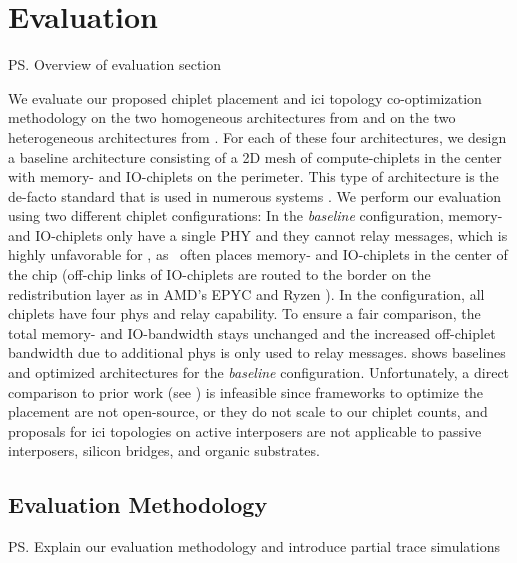\section{Evaluation}
\label{sec:eval}
\vspace{-0.5em}

\ps{Overview of evaluation section}


We evaluate our proposed chiplet placement and \gls{ici} topology co-optimization methodology on the two homogeneous architectures from  and on the two heterogeneous architectures from .
For each of these four architectures, we design a baseline architecture consisting of a 2D mesh of compute-chiplets in the center with memory- and IO-chiplets on the perimeter.
This type of architecture is the de-facto standard that is used in numerous systems \cite{dataflow_accel_dnn, cifher, simba, hecaton, dojo}.
We perform our evaluation using two different chiplet configurations: 
In the \textit{baseline} configuration, memory- and IO-chiplets only have a single PHY and they cannot relay messages, which is highly unfavorable for \name, as \name~often places memory- and IO-chiplets in the center of the chip (off-chip links of IO-chiplets are routed to the border on the redistribution layer as in AMD's EPYC and Ryzen \cite{amd-chiplet}).
In the \textit{\name} configuration, all chiplets have four \gls{phys} and relay capability.
To ensure a fair comparison, the total memory- and IO-bandwidth stays unchanged and the increased off-chiplet bandwidth due to additional \gls{phys} is only used to relay messages.
 shows baselines and optimized architectures for the \textit{baseline} configuration.
Unfortunately, a direct comparison to prior work (see ) is infeasible since frameworks to optimize the placement are not open-source, or they do not scale to our chiplet counts, and proposals for \gls{ici} topologies on active interposers are not applicable to passive interposers, silicon bridges, and organic substrates.

\vspace{-0.5em}
\subsection{Evaluation Methodology}
\label{ssec:eval-methodology}

\ps{Explain our evaluation methodology and introduce partial trace simulations}

